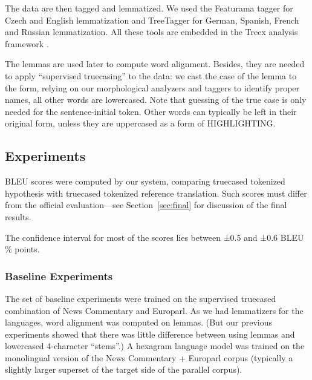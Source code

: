 \documentclass[11pt,letterpaper]{article}
\def\equo#1{``#1''}  %
\def\parcite#1{\cite{#1}}  %
\def\Sref#1{Section~\ref{#1}}
\def\parcite#1{\cite{#1}}
\begin{document}
\begin{comment}
We use a slightly modified tokenization rules compared to CzEng export format.
Most notably, we normalize English abbreviated negation and auxiliary verbs
(\equo{couldn't} $\rightarrow$ \equo{could not}) and attempt at normalizing
quotation marks to distinguish between opening and closing one following proper
typesetting rules.
\end{comment}

The data are then tagged and lemmatized.
We used the Featurama tagger for Czech and English lemmatization and TreeTagger for German, Spanish, French and Russian lemmatization. All these tools are embedded in the Treex analysis framework \parcite{tectomt}.

The lemmas are used later to compute word alignment.
Besides, they are needed to apply  \equo{supervised truecasing} to the data:
we cast the case of the lemma to the form, relying on our morphological
analyzers and taggers to identify proper names, all other words are lowercased.
Note that guessing of the true case is only needed for the sentence-initial token.
Other words can typically be left in their original form, unless they are
uppercased as a form of HIGHLIGHTING.



\subsection{Experiments}
\label{sec:experiments}

BLEU scores were computed by our system,
comparing truecased tokenized hypothesis with truecased tokenized reference translation.
Such scores must differ from the official evaluation---see \Sref{sec:final} for discussion of the final results.

The confidence interval for most of the scores lies between ±0.5 and ±0.6 BLEU $\%$ points.



\subsubsection{Baseline Experiments}

The set of baseline experiments were trained on the supervised truecased
combination of News Commentary and Europarl.
As we had lemmatizers for the languages, word alignment was computed on lemmas.
(But our previous experiments showed that there was little difference
between using lemmas and lowercased 4-character ``stems''.)
A hexagram language model was trained on the monolingual version of the
News Commentary + Europarl corpus (typically a slightly larger superset
of the target side of the parallel corpus).
\end{document}

